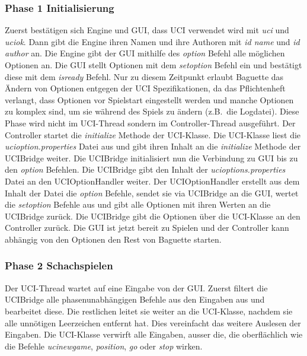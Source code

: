 \subsubsection{Phase 1 Initialisierung}
Zuerst best\"atigen sich Engine und GUI, dass UCI verwendet wird mit \textit{uci} und \textit{uciok}. \citeuci[59 - 66]
Dann gibt die Engine ihren Namen und ihre Authoren mit \textit{id name} und \textit{id author} an.
Die Engine gibt der GUI mithilfe des \textit{option} Befehl alle m\"oglichen Optionen an.
Die GUI stellt Optionen mit dem \textit{setoption} Befehl ein und best\"atigt diese mit dem \textit{isready} Befehl.
Nur zu diesem Zeitpunkt erlaubt Baguette das \"Andern von Optionen entgegen der UCI Spezifikationen\citeuci[89], da
das Pflichtenheft verlangt, dass Optionen vor Spielstart eingestellt werden und manche Optionen zu komplex sind, um sie
w\"ahrend des Spiels zu \"andern (z.B.\ die Logdatei).
\newline \newline
Diese Phase wird nicht im UCI-Thread sondern im Controller-Thread ausgef\"uhrt.
Der Controller startet die \textit{initialize} Methode der UCI-Klasse.
Die UCI-Klasse liest die \textit{ucioption.properties} Datei aus und gibt ihren Inhalt an die \textit{initialize} Methode
der UCIBridge weiter.
Die UCIBridge initialisiert nun die Verbindung zu GUI bis zu den \textit{option} Befehlen.
Die UCIBridge gibt den Inhalt der \textit{ucioptions.properties} Datei an den UCIOptionHandler weiter.
Der UCIOptionHandler erstellt aus dem Inhalt der Datei die \textit{option} Befehle, sendet sie via UCIBridge an die GUI,
wertet die \textit{setoption} Befehle aus und gibt alle Optionen mit ihren Werten an die UCIBridge zur\"uck.
Die UCIBridge gibt die Optionen \"uber die UCI-Klasse an den Controller zur\"uck.
Die GUI ist jetzt bereit zu Spielen und der Controller kann abh\"angig von den Optionen den Rest von Baguette starten.
\subsubsection{Phase 2 Schachspielen}
Der UCI-Thread wartet auf eine Eingabe von der GUI\@.
Zuerst filtert die UCIBridge alle phasenunabh\"angigen Befehle aus den Eingaben aus und bearbeitet diese.
Die restlichen leitet sie weiter an die UCI-Klasse, nachdem sie alle unn\"otigen Leerzeichen entfernt hat.
Dies vereinfacht das weitere Auslesen der Eingaben.
Die UCI-Klasse verwirft alle Eingaben, ausser die, die oberfl\"achlich wie die Befehle \textit{ucinewgame}, \textit{position},
\textit{go} oder \textit{stop} wirken.
